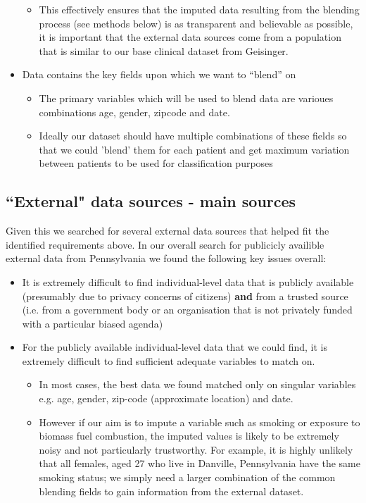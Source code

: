 \documentclass{article}
\begin{document}
\begin{itemize}
\begin{itemize}
    \item This effectively ensures that the imputed data resulting from the 
          blending process (see methods below) is as transparent and believable 
          as possible, it is important that the external data sources come 
          from a population that is similar to our base clinical dataset 
          from Geisinger.  
  \end{itemize}
  \item Data contains the key fields upon which we want to “blend” on
  \begin{itemize}
    \item The primary variables which will be used to blend data are varioues 
          combinations age, gender, zipcode and date.
    \item Ideally our dataset should have multiple combinations of these fields
          so that we could 'blend' them for each patient and get maximum 
          variation between patients to be used for classification purposes
  \end{itemize}
\end{itemize}

\subsection{``External" data sources - main sources}

\nonindent Given this we searched for several external data sources that helped
fit the identified requirements above. In our overall search for publicicly 
availible external data from Pennsylvania we found the 
following key issues overall:

\begin{itemize}
  \item It is extremely difficult to find individual-level data that is publicly 
        available (presumably due to privacy concerns of citizens) \textbf{and} 
        from a trusted source (i.e. from a government body or an organisation 
        that is not privately funded with a particular biased agenda)
  \item For the publicly available individual-level data that we 
        could find, it is extremely difficult to find sufficient adequate 
        variables to match on.         
  \begin{itemize}
    \item In most cases, the best data we found matched only on singular variables
          e.g. age, gender, zip-code (approximate location) and date.
    \item However if our aim is to impute a variable such as smoking or exposure
          to biomass fuel combustion, the imputed values is likely 
          to be extremely noisy and not particularly trustworthy. For example, it is 
          highly unlikely that all females, aged 27 who live in Danville, 
          Pennsylvania have the same smoking status; we simply need a larger 
          combination of the common blending fields to gain information from the
          external dataset.
  \end{itemize}
\end{itemize}
\end{document}
